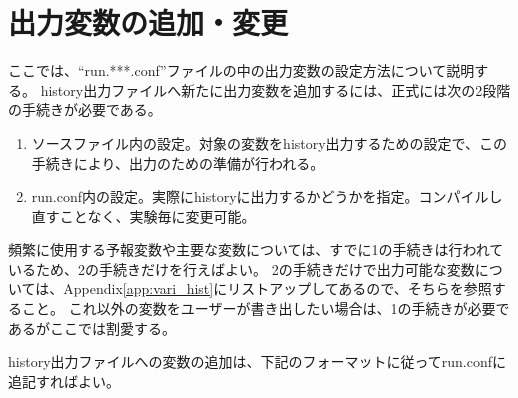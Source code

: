 

\section{出力変数の追加・変更}
\label{sec:output}
ここでは、``run.***.conf''ファイルの中の出力変数の設定方法について説明する。
history出力ファイルへ新たに出力変数を追加するには、正式には次の2段階の手続きが必要である。

\begin{enumerate}
\item ソースファイル内の設定。対象の変数をhistory出力するための設定で、この手続きにより、出力のための準備が行われる。
\item run.conf内の設定。実際にhistoryに出力するかどうかを指定。コンパイルし直すことなく、実験毎に変更可能。
\end{enumerate}
頻繁に使用する予報変数や主要な変数については、すでに1の手続きは行われているため、2の手続きだけを行えばよい。
2の手続きだけで出力可能な変数については、Appendix\ref{app:vari_hist}にリストアップしてあるので、そちらを参照すること。
これ以外の変数をユーザーが書き出したい場合は、1の手続きが必要であるがここでは割愛する。


history出力ファイルへの変数の追加は、下記のフォーマットに従ってrun.confに追記すればよい。\\

\\

